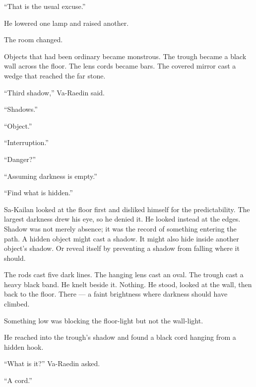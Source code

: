 “That is the usual excuse.”\par

He lowered one lamp and raised another.\par

The room changed.\par

Objects that had been ordinary became monstrous.
The trough became a black wall across the floor.
The lens cords became bars.
The covered mirror cast a wedge that reached the far stone.\par

“Third shadow,” Va-Raedin said.\par

“Shadows.”\par

“Object.”\par

“Interruption.”\par

“Danger?”\par

“Assuming darkness is empty.”\par

“Find what is hidden.”\par

Sa-Kailan looked at the floor first and disliked himself for the predictability.
The largest darkness drew his eye, so he denied it.
He looked instead at the edges.
Shadow was not merely absence; it was the record of something entering the path.
A hidden object might cast a shadow.
It might also hide inside another object’s shadow.
Or reveal itself by preventing a shadow from falling where it should.\par

The rods cast five dark lines.
The hanging lens cast an oval.
The trough cast a heavy black band.
He knelt beside it.
Nothing.
He stood, looked at the wall, then back to the floor.
There — a faint brightness where darkness should have climbed.\par

Something low was blocking the floor-light but not the wall-light.\par

He reached into the trough’s shadow and found a black cord hanging from a hidden hook.\par

“What is it?” Va-Raedin asked.\par

“A cord.”\par

